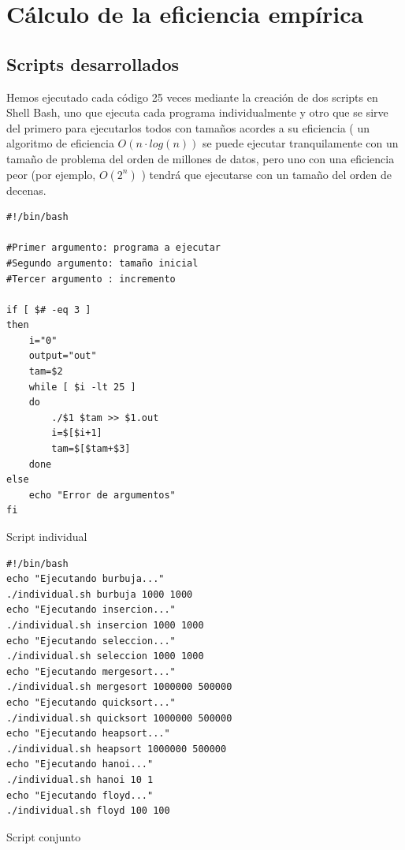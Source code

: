 \documentclass[12pt,spanish]{article}
\begin{document}
\section{Cálculo de la eficiencia empírica}
\subsection{Scripts desarrollados}
Hemos ejecutado cada código 25 veces mediante la creación de dos scripts en Shell Bash, uno que ejecuta cada programa individualmente y otro que se sirve del primero para ejecutarlos todos con tamaños acordes a su eficiencia ( un algoritmo de eficiencia $O(n \cdot log(n))$ se puede ejecutar tranquilamente con un tamaño de problema del orden de millones de datos, pero uno con una eficiencia peor (por ejemplo, $O(2^n)$ ) tendrá que ejecutarse con un tamaño del orden de decenas.
\begin{listing}[H]
\begin{verbatim}
#!/bin/bash

#Primer argumento: programa a ejecutar
#Segundo argumento: tamaño inicial
#Tercer argumento : incremento

if [ $# -eq 3 ]
then
	i="0"
	output="out"
	tam=$2
	while [ $i -lt 25 ]
	do
		./$1 $tam >> $1.out
		i=$[$i+1]
		tam=$[$tam+$3]
	done
else
	echo "Error de argumentos"
fi
\end{verbatim}
\caption{Script individual}
\end{listing}
\newpage

\begin{listing}[H]
\begin{verbatim}
#!/bin/bash
echo "Ejecutando burbuja..."
./individual.sh burbuja 1000 1000
echo "Ejecutando insercion..."
./individual.sh insercion 1000 1000
echo "Ejecutando seleccion..."
./individual.sh seleccion 1000 1000
echo "Ejecutando mergesort..."
./individual.sh mergesort 1000000 500000
echo "Ejecutando quicksort..."
./individual.sh quicksort 1000000 500000
echo "Ejecutando heapsort..."
./individual.sh heapsort 1000000 500000
echo "Ejecutando hanoi..."
./individual.sh hanoi 10 1
echo "Ejecutando floyd..."
./individual.sh floyd 100 100
\end{verbatim}
\caption{Script conjunto}
\end{listing}
\end{document}
